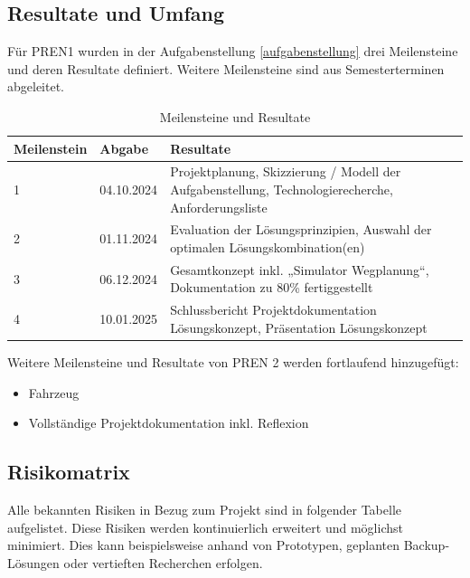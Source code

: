 \documentclass[../main.tex]{subfiles}
\begin{document}
\subsection{Resultate und Umfang}
Für PREN1 wurden in der Aufgabenstellung \ref{aufgabenstellung} drei Meilensteine und deren Resultate definiert. Weitere Meilensteine sind aus Semesterterminen abgeleitet.
\begin{table}[H]
\centering
\begin{tabular}{|l|l|p{10cm}|}
\hline
\textbf{Meilenstein} & \textbf{Abgabe} & \textbf{Resultate} \\ \hline
 1        & 04.10.2024      & Projektplanung, Skizzierung / Modell der Aufgabenstellung, Technologierecherche, Anforderungsliste \\ \hline
 2        & 01.11.2024      & Evaluation der Lösungsprinzipien, Auswahl der optimalen Lösungskombination(en) \\ \hline
 3        & 06.12.2024      & Gesamtkonzept inkl. „Simulator Wegplanung“, Dokumentation zu 80\% fertiggestellt \\ \hline
 4        & 10.01.2025      &  Schlussbericht Projektdokumentation Lösungskonzept, Präsentation Lösungskonzept\\ \hline 
 
\end{tabular}
\caption{Meilensteine und Resultate}
\label{tab:meilensteine}
\end{table}

Weitere Meilensteine und Resultate von PREN 2 werden fortlaufend hinzugefügt:
\begin{itemize}
\item Fahrzeug
\item Vollständige Projektdokumentation inkl. Reflexion
\end{itemize}
\subsection{Risikomatrix} \label{risikomatrix}

Alle bekannten Risiken in Bezug zum Projekt sind in folgender Tabelle aufgelistet. Diese Risiken werden kontinuierlich erweitert und möglichst minimiert. Dies kann beispielsweise anhand von Prototypen, geplanten Backup-Lösungen oder vertieften Recherchen erfolgen.
\end{document}
